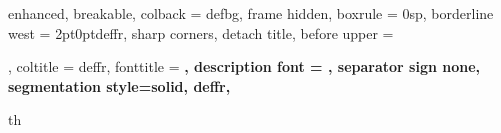 \usepackage{array}

\newcommand\TODO{{\bfseries \color{red} \itshape \underline{Todo}}}


\usepackage{tikz}
\usepackage[most,many,breakable]{tcolorbox}

{%
	enhanced,
	breakable,
	colback = defbg,
	frame hidden,
	boxrule = 0sp,
	borderline west = {2pt}{0pt}{deffr},
	sharp corners,
	detach title,
	before upper = \tcbtitle\par\smallskip,
	coltitle = deffr,
	fonttitle = \bfseries\sffamily,
	description font = \mdseries,
	separator sign none,
	segmentation style={solid, deffr},
}
{th}

